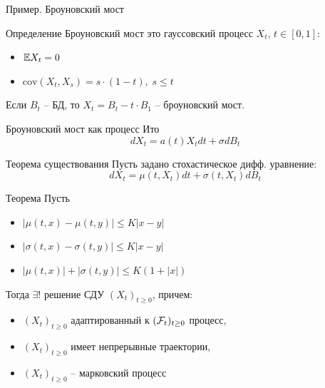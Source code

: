 \documentclass[aspectratio=169]{beamer}
\begin{document}
\begin{frame}{Пример. Броуновский мост}
    \begin{block}{Определение}
        Броуновский мост это гауссовский процесс $X_t$, $t\in[0, 1]$:
        \begin{itemize}
            \item $\mathbb{E} X_t = 0$
            \item $\mathrm{cov}(X_t, X_s) = s\cdot (1 - t), \; s \leq t$
        \end{itemize}
        Если $B_t$ -- БД, то $X_t = B_t - t \cdot B_1$ -- броуновский мост.
    \end{block}
    Броуновский мост как процесс Ито
    $$
        d X_t = a(t) X_t dt + \sigma dB_t
    $$
\end{frame}

\begin{frame}{Теорема существования}
    Пусть задано стохастическое дифф. уравнение:
    $$
        dX_t = \mu(t, X_t) dt + \sigma(t, X_t) dB_t
    $$
    \begin{block}{Теорема}
        Пусть 
        \begin{itemize}
            \item $|\mu(t, x) - \mu(t, y)| \leq K |x - y|$
            \item $|\sigma(t, x) - \sigma(t, y)| \leq K |x - y|$
            \item $|\mu(t, x)| + |\sigma(t, y)| \leq K (1 + |x|)$
        \end{itemize}

        Тогда $\exists !$ решение СДУ $(X_t)_{t\geq 0}$, причем:
        \begin{itemize}
            \item $(X_t)_{t\geq 0}$ адаптированный к $(\mathcal{F}_t)_{t\geq0}$ процесс,
            \item $(X_t)_{t\geq 0}$ имеет непрерывные траектории,
            \item $(X_t)_{t\geq 0}$ -- марковский процесс
        \end{itemize}
    \end{block}
\end{frame}
\end{document}

